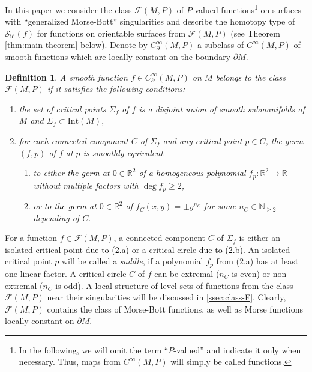 \documentclass[10pt,reqno]{amsart}
\newtheorem{definition}[subsection]{Definition}
\newcommand{\bbR}{\mathbb{R}}
\newcommand{\bbN}{\mathbb{N}}
\newcommand{\Sid}{\mathcal{S}_{\id}(f)}
\newcommand{\F}{\mathcal{F}(M,P)}
\newcommand{\id}{\mathrm{id}}
\newcommand{\Crit}{\Sigma_f}
\newcommand{\textr}[1]{\textcolor{black}{#1}}
\begin{document}
In this paper we consider the class $\F$ of $P$-valued functions\footnote[2]{In the following, we will omit the term ``$P$-valued'' and indicate it only when necessary. Thus, maps from $C^{\infty}(M,P)$ will simply be called functions.} on surfaces with ``generalized Morse-Bott'' singularities  
and describe the homotopy type of $\Sid$ for functions on orientable surfaces from $\F$ (see Theorem \ref{thm:main-theorem} below).  Denote by $C_{\partial}^{\infty}(M,P)$ a subclass of $C^{\infty}(M,P)$ of smooth functions which are locally constant on the boundary $\partial M.$
\begin{definition}\label{def:class-F} 
	 \normalfont A smooth function $f\in C_{\partial}^{\infty}(M,P)$ on $M$ belongs to the class $\mathcal{F}(M, P)$ if it satisfies the following conditions:
	\begin{enumerate}
		\item the set of critical points $\Sigma_f$ of $f$ is a disjoint union of smooth submanifolds of $M$ and $\Sigma_f\subset \mathrm{Int}(M),$
		\item  for each connected component $C$ of $\Sigma_f$ and any critical point $p\in C$,
		the germ $(f,p)$ of $f$ at $p$ is smoothly equivalent 
		\begin{enumerate}
			\item[(a)] to either \textr{the germ at $0\in \bbR^2$ of a homogeneous polynomial} $f_p:\bbR^2\to \bbR$ without multiple factors  with $\deg f_p\geq 2$,
			\item[(b)] or to \textr{the germ at $0\in \bbR^2$ } of  $f_C(x,y) = \pm y^{n_C}$  for some $n_C\in \bbN_{\geq 2}$ depending of $C.$  
		\end{enumerate}
	\end{enumerate}
\end{definition}
For a function $f\in \F$, a connected component $C$ of $\Crit$ is either an isolated critical point \textr{due to (2.a)} or a critical circle \textr{due to (2.b)}. 
{An isolated critical point  $p$ will be called a {\it saddle}, if a polynomial $f_p$ from (2.a) has at least one linear factor. A critical circle $C$ of $f$ can be  extremal ($n_C$ is even) or non-extremal ($n_C$ is odd).}
A local structure of level-sets  of functions from the class $\F$ near their singularities will be discussed  in \textsection \ref{ssec:class-F}. 
Clearly, $\F$ contains the class of Morse-Bott functions, as well as  Morse functions locally constant on $\partial M$.
\end{document}

